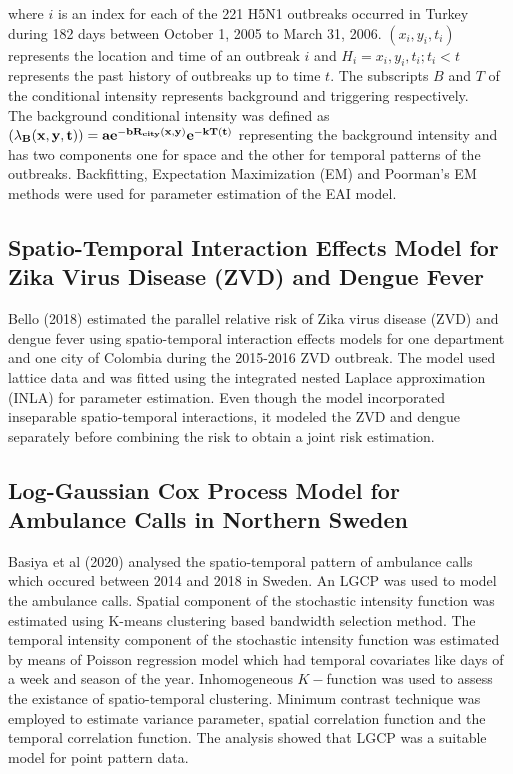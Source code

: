 \documentclass[12pt,a4paper]{report}
\begin{document}
where $i$ is an index for each of the 221 H5N1 outbreaks occurred in Turkey during 182 days between October 1, 2005 to March 31, 2006. $(x_i, y_i, t_i)$ represents the location and time of an outbreak $i$ and $H_i = {x_i, y_i, t_i ; t_i < t}$ represents the past history of outbreaks up to time $t$. The subscripts $B$ and $T$ of the conditional intensity represents background and triggering respectively.\\

The background conditional intensity was defined as $\bf(\lambda_B(x,y,t)) = ae^{-bR_{city}(x,y)} e^{-kT(t)}$ representing the background intensity and has two components one for space and the other for temporal patterns of the outbreaks. Backfitting, Expectation Maximization (EM) and Poorman's EM methods were used for parameter estimation of the EAI model.\cite{Kim}

\subsection{Spatio-Temporal Interaction Effects Model for Zika Virus Disease (ZVD) and Dengue Fever}

Bello (2018) estimated the parallel relative risk of Zika virus disease (ZVD) and dengue fever using spatio-temporal interaction effects models for one department and one city of Colombia during the 2015-2016 ZVD outbreak. The model used lattice data and was fitted using the integrated nested Laplace approximation (INLA) for parameter estimation\cite{Bello2018}. Even though the model incorporated inseparable spatio-temporal interactions, it modeled the ZVD and dengue separately before combining the risk to obtain a joint risk estimation.

\subsection{Log-Gaussian Cox Process Model for Ambulance Calls in Northern Sweden}

Basiya et al (2020) analysed the spatio-temporal pattern of ambulance calls which occured between 2014 and 2018 in Sweden. An LGCP was used to model the ambulance calls. Spatial component of the stochastic intensity function was estimated using K-means clustering based bandwidth selection method. The temporal intensity component of the stochastic intensity function was estimated by means of Poisson regression model which had temporal covariates like days of a week and season of the year. Inhomogeneous $K-$function was used to assess the existance of spatio-temporal clustering. 
Minimum contrast technique was employed to estimate variance parameter, spatial correlation function and the temporal correlation function.\cite{Basiya} The analysis showed that LGCP was a suitable model for point pattern data.
\end{document}
